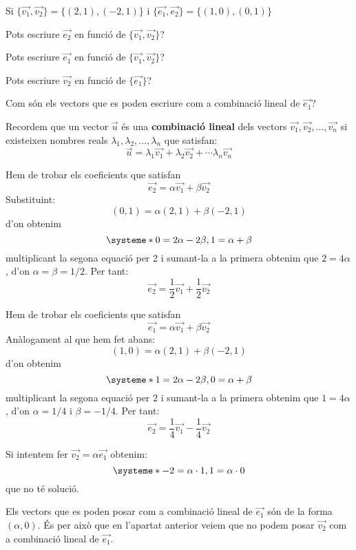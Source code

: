 \Exercise Si $\{\overrightarrow{v_1},\overrightarrow{v_2}\} = \{ (2,1),(-2,1) \}$ i $\{\overrightarrow{e_1},\overrightarrow{e_2}\} = \{ (1,0),(0,1) \}$
\begin{llista}
  \item Pots escriure $\overrightarrow{e_2}$ en funció de $\{\overrightarrow{v_1},\overrightarrow{v_2}\}$?
  \item Pots escriure $\overrightarrow{e_1}$ en funció de $\{\overrightarrow{v_1},\overrightarrow{v_2}\}$?
  \item Pots escriure $\overrightarrow{v_2}$ en funció de $\{\overrightarrow{e_1}\}$?
  \item Com són els vectors que es poden escriure com a combinació lineal de $\overrightarrow{e_1}$?
\end{llista}

\Answer Recordem que un vector $\vec{u}$ és una {\bf combinació lineal} dels vectors $\overrightarrow{v_1},\overrightarrow{v_2}, \ldots , \overrightarrow{v_n}$ si existeixen nombres reals $\lambda_1, \lambda_2, \ldots, \lambda_n$ que satisfan:
\[\vec{u} = \lambda_1 \overrightarrow{v_1} + \lambda_2 \overrightarrow{v_2} + \cdots \lambda_n \overrightarrow{v_n}\]

\begin{llista}
  \item Hem de trobar els coeficients que satisfan 
  \[\vec{e_2} = \alpha \overrightarrow{v_1} + \beta \overrightarrow{v_2} \]
  Substituint:
  \[(0,1)=\alpha (2,1) + \beta (-2,1)\]
  d'on obtenim 
  \[
    \systeme*{0=2\alpha-2\beta, 1=\alpha+\beta}
  \]
  multiplicant la segona equació per 2 i sumant-la a la primera obtenim que $2=4\alpha$, d'on $\alpha=\beta=1/2$. Per tant:
  \[\vec{e_2} = \frac{1}{2} \overrightarrow{v_1} +\frac{1}{2} \overrightarrow{v_2} \]
  \item Hem de trobar els coeficients que satisfan 
  \[\vec{e_1} = \alpha \overrightarrow{v_1} + \beta \overrightarrow{v_2} \]
  Anàlogament al que hem fet abans:
  \[(1,0)=\alpha (2,1) + \beta (-2,1)\]
  d'on obtenim 
  \[
    \systeme*{1=2\alpha-2\beta, 0=\alpha+\beta}
  \]
  multiplicant la segona equació per 2 i sumant-la a la primera obtenim que $1=4\alpha$, d'on $\alpha=1/4$ i $\beta=-1/4$. Per tant:
  \[\vec{e_2} = \frac{1}{4} \overrightarrow{v_1} -\frac{1}{4} \overrightarrow{v_2} \]
  \item Si intentem fer $\overrightarrow{v_2} = \alpha \vec{e_1}$ obtenim:
  \[
    \systeme*{-2=\alpha\cdot 1, 1=\alpha\cdot 0}
  \]
  que no té solució. 
  \item Els vectors que es poden posar com a combinació lineal de $\vec{e_1}$ són de la forma $(\alpha,0)$. És per això que en l'apartat anterior veiem que no podem posar $\overrightarrow{v_2}$ com a combinació lineal de $\vec{e_1}$.
\end{llista}
\blacksquare

